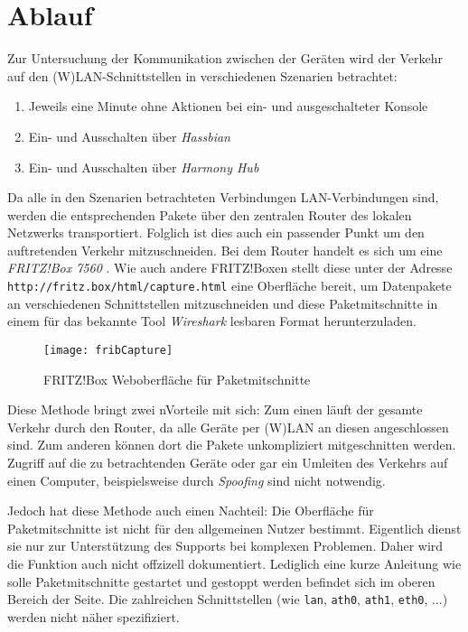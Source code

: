 \newpage
\section{Ablauf}\label{sec:ablauf}
Zur Untersuchung der Kommunikation zwischen der Geräten wird der Verkehr auf den
(W)LAN-Schnittstellen in verschiedenen Szenarien betrachtet:

\begin{enumerate}
    \setlength\itemsep{-0.5em}
    \item Jeweils eine Minute ohne Aktionen bei ein- und ausgeschalteter Konsole
    \item Ein- und Ausschalten über \textit{Hassbian}
    \item Ein- und Ausschalten über \textit{Harmony Hub}
\end{enumerate}

Da alle in den Szenarien betrachteten Verbindungen LAN-Verbindungen sind,
werden die entsprechenden Pakete über den zentralen Router des lokalen Netzwerks transportiert.
Folglich ist dies auch ein passender Punkt um den auftretenden Verkehr mitzuschneiden.
Bei dem Router handelt es sich um eine \textit{FRITZ!Box 7560} \cite{FRITZBox29:online}.
Wie auch andere FRITZ!Boxen stellt diese unter der Adresse \nolinkurl{http://fritz.box/html/capture.html} eine Oberfläche bereit,
um Datenpakete an verschiedenen Schnittstellen mitzuschneiden und diese Paketmitschnitte
in einem für das bekannte Tool \textit{Wireshark} lesbaren Format herunterzuladen.

\begin{figure}[ht!]
    \centering
    \texttt{[image: fribCapture]}
    \caption{FRITZ!Box Weboberfläche für Paketmitschnitte}\label{fig:fribCapture}
\end{figure}

Diese Methode bringt zwei nVorteile mit sich:
Zum einen läuft der gesamte Verkehr durch den Router, da alle Geräte per (W)LAN an diesen angeschlossen sind.
Zum anderen können dort die Pakete unkompliziert mitgeschnitten werden. Zugriff auf die zu betrachtenden Geräte
oder gar ein Umleiten des Verkehrs auf einen Computer, beispielsweise durch \textit{Spoofing} \cite{Maninthe12:online} sind nicht notwendig.

Jedoch hat diese Methode auch einen Nachteil:
Die Oberfläche für Paketmitschnitte ist nicht für den allgemeinen Nutzer bestimmt.
Eigentlich dienst sie nur zur Unterstützung des Supports bei komplexen Problemen.
Daher wird die Funktion auch nicht offzizell dokumentiert.
Lediglich eine kurze Anleitung wie solle Paketmitschnitte gestartet und gestoppt werden befindet sich im oberen Bereich der Seite.
Die zahlreichen Schnittstellen (wie \texttt{lan}, \texttt{ath0}, \texttt{ath1}, \texttt{eth0}, ...) werden nicht näher spezifiziert.


